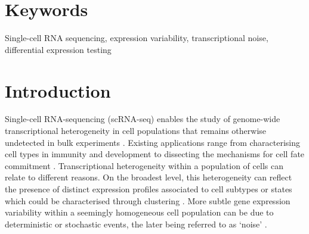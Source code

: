 \documentclass[9pt,a4paper,]{extarticle}
\begin{document}
\section*{Keywords}
Single-cell RNA sequencing, expression variability, transcriptional noise, differential expression testing


\clearpage
\pagestyle{main}

\hypertarget{introduction}{%
\section{Introduction}\label{introduction}}

Single-cell RNA-sequencing (scRNA-seq) enables the study of genome-wide
transcriptional heterogeneity in cell populations that remains otherwise
undetected in bulk experiments \citep{Stegle2015, Prakadan2017, Patange2018}.
Existing applications range from characterising cell types in immunity
\citep{Lonnberg2017, Villani2017, Zheng2017} and development \citep{Ibarra-Soria2018, Wagner2018, Pijuan-Sala2019} to dissecting the mechanisms for cell fate
commitment \citep{Goolam2016, Ohnishi2014}.
Transcriptional heterogeneity within a population of cells can relate to
different reasons.
On the broadest level, this heterogeneity can reflect the presence of distinct
expression profiles associated to cell subtypes or states which could be
characterised through clustering \citep{Kiselev2019}.
More subtle gene expression variability within a seemingly homogeneous cell
population can be due to deterministic or stochastic events, the later being
referred to as `noise' \citep{Elowitz2002}.

{\small}
\end{document}
